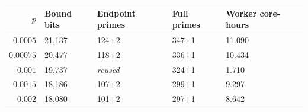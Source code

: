 \begin{tabular}{rllll}
\toprule
$p$ & Bound bits & Endpoint primes & Full primes & Worker core-hours \\
\midrule
$0.0005$ & 21,137 & 124+2 & 347+1 & 11.090 \\
$0.00075$ & 20,477 & 118+2 & 336+1 & 10.434 \\
$0.001$ & 19,737 & \emph{reused} & 324+1 & 1.710 \\
$0.0015$ & 18,186 & 107+2 & 299+1 & 9.297 \\
$0.002$ & 18,080 & 101+2 & 297+1 & 8.642 \\
\bottomrule
\end{tabular}
